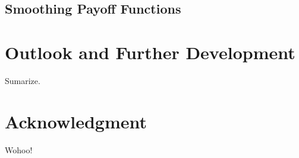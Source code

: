 \documentclass{UUThesisTemplate}
\begin{document}
\section{Smoothing Payoff Functions}
%
%
\chapter{Outlook and Further Development}
Sumarize.

\backmatter
    \nocite{*} %
    
    

\chapter{Acknowledgment}
Wohoo!
\end{document}
